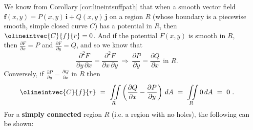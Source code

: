We know from Corollary \ref{cor:lineintsuffpath} that when a smooth vector field
$\textbf{f}(x,y) = P(x,y)\,\textbf{i} + Q(x,y)\,\textbf{j}$ on a region $R$ (whose boundary is a piecewise smooth,
simple closed curve $C$) has a potential in $R$, then $\olineintvec{C}{f}{r} = 0$. And if the potential
$F(x,y)$ is smooth in $R$, then
$\frac{\partial F}{\partial x} = P$ and $\frac{\partial F}{\partial y} = Q$, and so we know that
\begin{displaymath}
 \frac{\partial^2 F}{\partial y \,\partial x} = \frac{\partial^2 F}{\partial x \,\partial y} ~\Rightarrow~
 \frac{\partial P}{\partial y} = \frac{\partial Q}{\partial x} ~~\text{in $R$.}
\end{displaymath}
Conversely, if $\frac{\partial P}{\partial y} = \frac{\partial Q}{\partial x}$ in $R$ then
\begin{displaymath}
 \olineintvec{C}{f}{r} ~=~ \iint\limits_{R} \left( \frac{\partial Q}{\partial x} -
   \frac{\partial P}{\partial y} \right)\,dA ~=~ \iint\limits_{R} 0\,dA ~=~ 0 ~.
\end{displaymath}
For a \textbf{simply connected} region $R$ (i.e. a region with no holes), the following can be
shown:\vspace{3mm}
